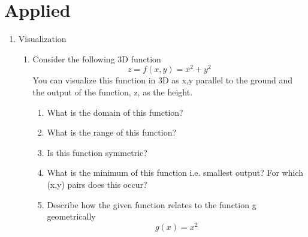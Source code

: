 \documentclass{article}
\begin{document}
\section{Applied}
\begin{enumerate}

    \item Visualization
    \begin{enumerate}
        \item Consider the following 3D function
        \[ z = f(x,y) = x^2 + y^2\]
        You can visualize this function in 3D as x,y parallel to the ground and the output of the function, z, as the height.
        \begin{enumerate}
            \item What is the domain of this function?
            \item What is the range of this function?
            \item Is this function symmetric?
            \item What is the minimum of this function i.e. smallest output? For which (x,y) pairs does this occur?
            \item Describe how the given function relates to the function g geometrically
            \[ g(x) = x^2\]
        \end{enumerate}
    \end{enumerate}
    

\end{enumerate}
\end{document}
